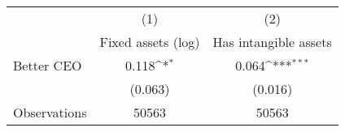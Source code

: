 {
\def\sym#1{\ifmmode^{#1}\else\(^{#1}\)\fi}
\begin{tabular}{l*{2}{c}}
\hline\hline
                    &\multicolumn{1}{c}{(1)}&\multicolumn{1}{c}{(2)}\\
                    &\multicolumn{1}{c}{Fixed assets (log)}&\multicolumn{1}{c}{Has intangible assets}\\
\hline
Better CEO          &       0.118\sym{*}  &       0.064\sym{***}\\
                    &     (0.063)         &     (0.016)         \\
\hline
Observations        &       50563         &       50563         \\
\hline\hline
\end{tabular}
}
